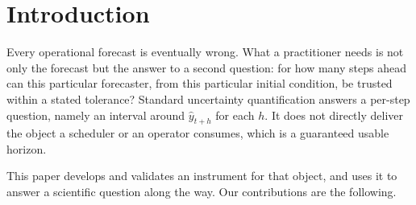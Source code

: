 \documentclass[aps,pre,twocolumn,superscriptaddress,nofootinbib,longbibliography]{revtex4-2}
\begin{document}
\maketitle

\section{Introduction}
\label{sec:intro}

Every operational forecast is eventually wrong. What a practitioner needs
is not only the forecast but the answer to a second question: for how many
steps ahead can this particular forecaster, from this particular initial
condition, be trusted within a stated tolerance? Standard uncertainty
quantification answers a per-step question, namely an interval around
$\hat y_{t+h}$ for each $h$. It does not directly deliver the object a
scheduler or an operator consumes, which is a guaranteed usable horizon.

This paper develops and validates an instrument for that object, and uses
it to answer a scientific question along the way. Our contributions are
the following.
\end{document}
